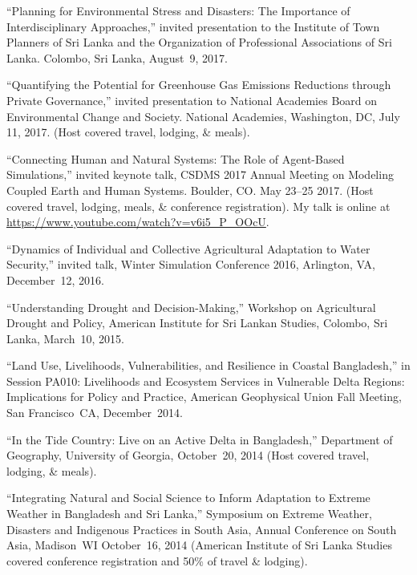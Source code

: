 \item ``Planning for Environmental Stress and Disasters: The Importance of Interdisciplinary Approaches,'' invited presentation to the Institute of Town Planners of Sri Lanka and the Organization of Professional Associations of Sri Lanka. Colombo, Sri Lanka, August~9, 2017.
\item ``Quantifying the Potential for Greenhouse Gas Emissions Reductions through Private Governance,'' invited presentation to National Academies Board on Environmental Change and Society. National Academies, Washington, DC, July 11, 2017. (Host covered travel, lodging, \& meals).
\item  ``Connecting Human and Natural Systems: The Role of Agent-Based Simulations,'' invited keynote talk, CSDMS 2017 Annual Meeting on Modeling Coupled Earth and Human Systems. Boulder, CO. May 23--25 2017. (Host covered travel, lodging, meals, \& conference registration). My talk is online at \url{https://www.youtube.com/watch?v=v6i5_P_OOcU}.
\item  ``Dynamics of Individual and Collective Agricultural Adaptation to Water Security,'' invited talk, Winter Simulation Conference 2016, Arlington, VA, December~12, 2016.
\item ``Understanding Drought and Decision-Making,'' Workshop on Agricultural Drought and Policy, American Institute for Sri Lankan Studies, Colombo, Sri Lanka, March~10, 2015.
\item ``Land Use, Livelihoods, Vulnerabilities, and Resilience in Coastal Bangladesh,'' in Session PA010: Livelihoods and Ecosystem Services in Vulnerable Delta Regions: Implications for Policy and Practice, American Geophysical Union Fall Meeting, San Francisco~CA, December~2014.
\item ``In the Tide Country: Live on an Active Delta in Bangladesh,'' Department of Geography, University of Georgia, October~20, 2014 (Host covered travel, lodging, \& meals).
\item ``Integrating Natural and Social Science to Inform Adaptation to Extreme Weather in Bangladesh and Sri Lanka,'' Symposium on Extreme Weather, Disasters and Indigenous Practices in South Asia, Annual Conference on South Asia, Madison~WI October~16, 2014 (American Institute of Sri Lanka Studies covered conference registration and 50\% of travel \& lodging).
